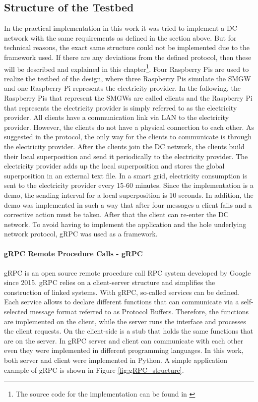 \subsection{Structure of the Testbed}
In the practical implementation in this work it was tried to implement a DC network with the same requirements as defined in the section above. But for technical reasons, the exact same structure could not be implemented due to the framework used. If there are any deviations from the defined protocol, then these will be described and explained in this chapter\footnote[5]{The source code for the implementation can be found in \cite{Impl}}.
Four Raspberry Pis are used to realize the testbed of the design, where three Raspberry Pis simulate the \gls{SMGW} and one Raspberry Pi represents the electricity provider. In the following, the Raspberry Pis that represent the \gls{SMGW}s are called clients and the Raspberry Pi that represents the electricity provider is simply referred to as the electricity provider. All clients have a communication link via \gls{LAN} to the electricity provider. However, the clients do not have a physical connection to each other. As suggested in the protocol, the only way for the clients to communicate is through the electricity provider. After the clients join the DC network, the clients build their local superposition and send it periodically to the electricity provider. The electricity provider adds up the local superposition and stores the global superposition in an external text file. In a smart grid, electricity consumption is sent to the electricity provider every 15-60 minutes. Since the implementation is a demo, the sending interval for a local superposition is 10 seconds. In addition, the demo was implemented in such a way that after four messages a client fails and a corrective action must be taken. After that the client can re-enter the DC network. To avoid having to implement the application and the hole underlying network protocol, gRPC was used as a framework.\\
\\
\textbf{gRPC Remote Procedure Calls - gRPC}
\\
\\
gRPC \cite{gRPC} is an open source remote procedure call \gls{RPC} system developed by Google since 2015. gRPC relies on a client-server structure and simplifies the construction of linked systems. With gRPC, so-called services can be defined. Each service allows to declare different functions that can communicate via a self-selected message format referred to as Protocol Buffers. Therefore, the functions are implemented on the client, while the server runs the interface and processes the client requests. On the client-side is a stub that holds the same functions that are on the server. In gRPC server and client can communicate with each other even they were implemented in different programming languages. In this work, both server and client were implemented in Python. A simple application example of gRPC is shown in Figure \ref{fig:gRPC_structure}.
